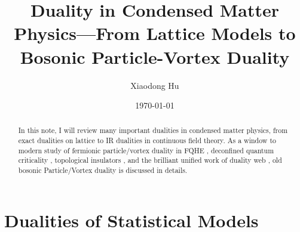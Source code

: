 \documentclass[10pt,nofootinbib]{revtex4}
\numberwithin{equation}{section}
\begin{document}
\title{Duality in Condensed Matter Physics---From Lattice Models to Bosonic Particle-Vortex Duality}%

\author{Xiaodong Hu}

\date{\today}


\begin{abstract}
	In this note, I will review many important dualities in condensed matter physics, from exact dualities on lattice to IR dualities in continuous field theory. As a window to modern study of fermionic particle/vortex duality in FQHE \cite{son2015composite}, deconfined quantum criticality \cite{senthil2004deconfined}, topological insulators \cite{murugan2017particle}, and the brilliant unified work of duality web \cite{seiberg2016duality,senthil2019duality}, old bosonic Particle/Vortex duality is discussed in details. 
\end{abstract}
\maketitle
\tableofcontents
\section{Dualities of Statistical Models}
\end{document}
